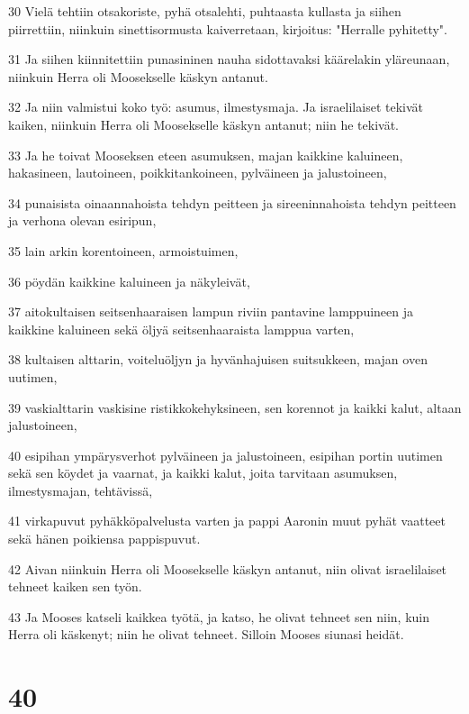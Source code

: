 \par 30 Vielä tehtiin otsakoriste, pyhä otsalehti, puhtaasta kullasta ja siihen piirrettiin, niinkuin sinettisormusta kaiverretaan, kirjoitus: "Herralle pyhitetty".
\par 31 Ja siihen kiinnitettiin punasininen nauha sidottavaksi käärelakin yläreunaan, niinkuin Herra oli Moosekselle käskyn antanut.
\par 32 Ja niin valmistui koko työ: asumus, ilmestysmaja. Ja israelilaiset tekivät kaiken, niinkuin Herra oli Moosekselle käskyn antanut; niin he tekivät.
\par 33 Ja he toivat Mooseksen eteen asumuksen, majan kaikkine kaluineen, hakasineen, lautoineen, poikkitankoineen, pylväineen ja jalustoineen,
\par 34 punaisista oinaannahoista tehdyn peitteen ja sireeninnahoista tehdyn peitteen ja verhona olevan esiripun,
\par 35 lain arkin korentoineen, armoistuimen,
\par 36 pöydän kaikkine kaluineen ja näkyleivät,
\par 37 aitokultaisen seitsenhaaraisen lampun riviin pantavine lamppuineen ja kaikkine kaluineen sekä öljyä seitsenhaaraista lamppua varten,
\par 38 kultaisen alttarin, voiteluöljyn ja hyvänhajuisen suitsukkeen, majan oven uutimen,
\par 39 vaskialttarin vaskisine ristikkokehyksineen, sen korennot ja kaikki kalut, altaan jalustoineen,
\par 40 esipihan ympärysverhot pylväineen ja jalustoineen, esipihan portin uutimen sekä sen köydet ja vaarnat, ja kaikki kalut, joita tarvitaan asumuksen, ilmestysmajan, tehtävissä,
\par 41 virkapuvut pyhäkköpalvelusta varten ja pappi Aaronin muut pyhät vaatteet sekä hänen poikiensa pappispuvut.
\par 42 Aivan niinkuin Herra oli Moosekselle käskyn antanut, niin olivat israelilaiset tehneet kaiken sen työn.
\par 43 Ja Mooses katseli kaikkea työtä, ja katso, he olivat tehneet sen niin, kuin Herra oli käskenyt; niin he olivat tehneet. Silloin Mooses siunasi heidät.

\chapter{40}


